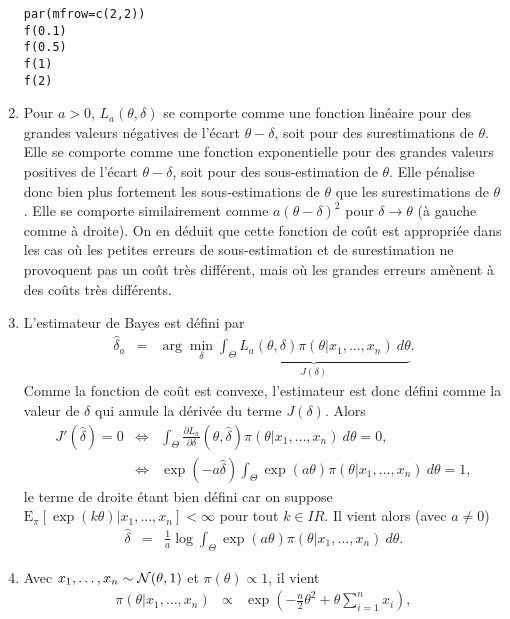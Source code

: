 \documentclass[10pt]{article}
\newcommand{\R}{I\!\!R}
\newcommand{\E}{\mbox{E}}
\newcommand{\1}{\mathbbm{1}}
\begin{document}
\begin{enumerate}
\begin{verbatim}
par(mfrow=c(2,2))
f(0.1)
f(0.5)
f(1)
f(2)
\end{verbatim} 
\item Pour $a>0$, $L_a(\theta,\delta)$ se comporte comme une fonction lin\'eaire pour des grandes valeurs n\'egatives de l'\'ecart $\theta-\delta$, soit pour des surestimations de $\theta$. Elle se comporte comme une fonction exponentielle pour des grandes valeurs positives de l'\'ecart $\theta-\delta$, soit pour des sous-estimation de $\theta$. Elle p\'enalise donc bien plus fortement les sous-estimations de $\theta$ que les surestimations de $\theta$. Elle se comporte similairement comme $a(\theta-\delta)^2$ pour $\delta\to\theta$ (\`a gauche comme \`a droite). On en d\'eduit que cette fonction de co\^ut est appropri\'ee dans les cas o\`u les petites erreurs de sous-estimation et de surestimation ne provoquent pas un co\^ut tr\`es diff\'erent, mais o\`u les grandes erreurs am\`enent \`a des co\^uts tr\`es diff\'erents. 
\item L'estimateur de Bayes est d\'efini par
\begin{eqnarray*}
\hat{\delta}_a & = & \arg\min\limits_{\delta} \underbrace{\int_{\Theta} L_a(\theta,\delta) \pi(\theta|x_1,\ldots,x_n) \ d\theta}_{J(\delta)}.
\end{eqnarray*}
Comme la fonction de co\^ut est convexe, l'estimateur est donc d\'efini comme la valeur de $\delta$ qui annule la d\'eriv\'ee du terme $J(\delta)$. Alors
\begin{eqnarray*}
J'(\hat{\delta}) = 0 & \Leftrightarrow & \int_{\Theta} \frac{\partial L_a}{\partial \delta}(\theta,\hat{\delta}) \pi(\theta|x_1,\ldots,x_n) \ d\theta = 0, \\
& \Leftrightarrow & \exp(-a\hat{\delta}) \int_{\Theta} \exp(a\theta) \pi(\theta|x_1,\ldots,x_n) \ d\theta = 1,
\end{eqnarray*}
le terme de droite \'etant bien d\'efini car on suppose $\E_{\pi}[\exp(k\theta)|x_1,\ldots,x_n]<\infty$ pour tout $k\in\R$. Il vient alors (avec $a\neq 0$) 
\begin{eqnarray}
\hat{\delta} & = & \frac{1}{a}\log  \int_{\Theta} \exp(a\theta) \pi(\theta|x_1,\ldots,x_n) \ d\theta. \label{estimateur}
\end{eqnarray}
\item Avec $x_1,\ldots,x_n\sim{\cal{N}}(\theta,1)$ et $\pi(\theta)\propto 1$, il vient
\begin{eqnarray*}
\pi(\theta|x_1,\ldots,x_n) & \propto & \exp\left(- \frac{n}{2}\theta^2 + \theta \sum\limits_{i=1}^n x_i \right), \\

\end{eqnarray*}
\end{enumerate}
\end{document}
